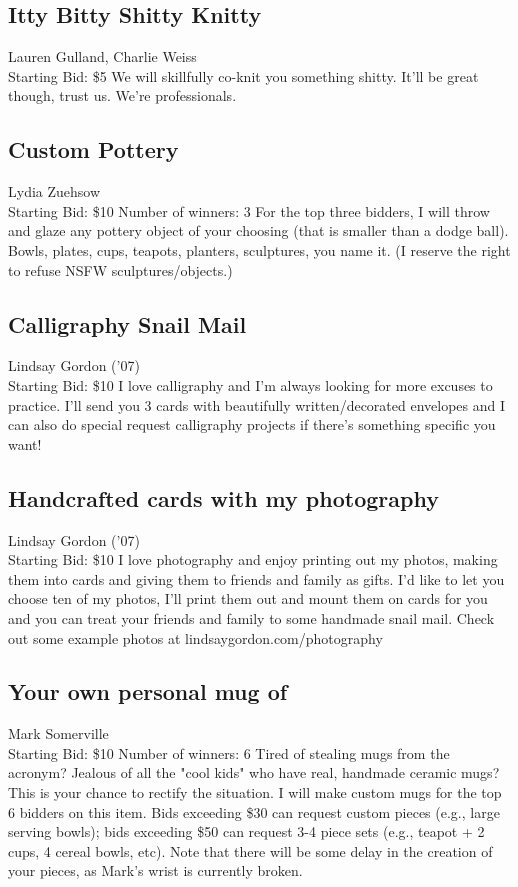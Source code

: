 \documentclass[11pt]{article}
\begin{document}
\subsection{Itty Bitty Shitty Knitty}
Lauren Gulland, Charlie Weiss
\\
Starting Bid: \$5
\newline
We will skillfully co-knit you something shitty. It'll be great though, trust us. We're professionals.
\subsection{Custom Pottery}
Lydia Zuehsow
\\
Starting Bid: \$10
\newline
Number of winners: 3
\newline
For the top three bidders, I will throw and glaze any pottery object of your choosing (that is smaller than a dodge ball). Bowls, plates, cups, teapots, planters, sculptures, you name it.
(I reserve the right to refuse NSFW sculptures/objects.)
\subsection{Calligraphy Snail Mail}
Lindsay Gordon ('07)
\\
Starting Bid: \$10
\newline
I love calligraphy and I'm always looking for more excuses to practice. I’ll send you 3 cards with beautifully written/decorated envelopes and I can also do special request calligraphy projects if there's something specific you want!
\subsection{Handcrafted cards with my photography}
Lindsay Gordon ('07)
\\
Starting Bid: \$10
\newline
I love photography and enjoy printing out my photos, making them into cards and giving them to friends and family as gifts. I’d like to let you choose ten of my photos, I’ll print them out and mount them on cards for you and you can treat your friends and family to some handmade snail mail. Check out some example photos at lindsaygordon.com/photography
\subsection{Your own personal mug of}
Mark Somerville
\\
Starting Bid: \$10
\newline
Number of winners: 6
\newline
Tired of stealing mugs from the acronym? Jealous of all the "cool kids" who have real, handmade ceramic mugs?  This is your chance to rectify the situation. I will make custom mugs for the top 6 bidders on this item.  Bids exceeding \$30 can request custom pieces (e.g., large serving bowls); bids exceeding \$50 can request 3-4 piece sets (e.g., teapot + 2 cups, 4 cereal bowls, etc).  Note that there will be some delay in the creation of your pieces, as Mark's wrist is currently broken.
\end{document}

